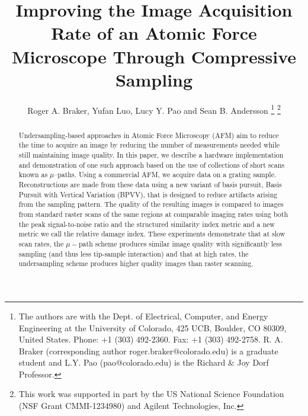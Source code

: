 \documentclass[twocolumn,oneside]{IEEEtran/IEEEtran}
\begin{document}
\title{Improving the Image Acquisition Rate of an Atomic Force Microscope Through Compressive Sampling}

\author{Roger A. Braker, Yufan Luo, Lucy Y. Pao and Sean B. Andersson
  \thanks{The authors are with the Dept. of Electrical, Computer, and Energy
    Engineering at the University of Colorado, 425 UCB, Boulder, CO 80309,
    United States. Phone: +1 (303) 492-2360. Fax: +1 (303) 492-2758. R. A.
    Braker (corresponding author roger.braker@colorado.edu) is a graduate
    student and L.Y. Pao (pao@colorado.edu) is the Richard \& Joy Dorf
    Professor.} \thanks{This work was supported in part by the US National
    Science Foundation (NSF Grant CMMI-1234980) and Agilent Technologies, Inc.}
}

\maketitle
\begin{abstract}
  Undersampling-based approaches in Atomic Force Microscopy (AFM) aim to reduce
  the time to acquire an image by reducing the number of measurements needed
  while still maintaining image quality. In this paper, we describe a hardware
  implementation and demonstration of one such approach based on the use of
  collections of short scans known as $\mu$--paths. Using a commercial AFM, we
  acquire data on a grating sample.
  Reconstructions are made from these data using
  a new variant of basis
  pursuit, Basis Pursuit with Vertical Variation (BPVV), that is designed to reduce
  artifacts arising from the sampling pattern. The quality of the resulting
  images is compared to images from standard raster scans of the same regions at
  comparable imaging rates using both the peak signal-to-noise ratio and the
  structured similarity index metric
  and a new metric we call the relative damage index.
  These experiments demonstrate that at slow
  scan rates, the $\mu-$path scheme produces similar image quality with
  significantly less sampling (and thus less tip-sample interaction) and that at
  high rates, the undersampling scheme produces higher quality images than
  raster scanning.
\end{abstract}
\end{document}
